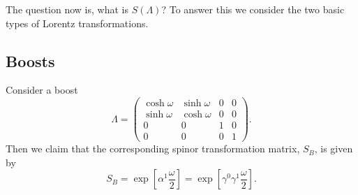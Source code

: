 \documentclass[fleqn]{NotesClass}
\begin{document}
    The question now is, what is \(S(\Lambda)\)?
    To answer this we consider the two basic types of Lorentz transformations.
    
    \subsection{Boosts}
    Consider a boost
    \begin{equation}
        \Lambda = 
        \begin{pmatrix}
            \cosh \omega & \sinh \omega & 0 & 0\\
            \sinh \omega & \cosh \omega & 0 & 0\\
            0 & 0 & 1 & 0\\
            0 & 0 & 0 & 1
        \end{pmatrix}
        .
    \end{equation}
    Then we claim that the corresponding spinor transformation matrix, \(S_B\), is given by
    \begin{equation}
        S_B = \exp\left[ \alpha^1 \frac{\omega}{2} \right] = \exp\left[ \gamma^0\gamma^1 \frac{\omega}{2} \right].
    \end{equation}
    
\end{document}
